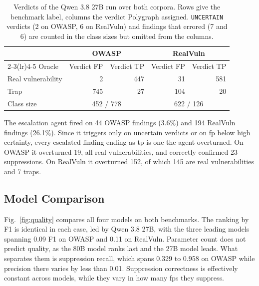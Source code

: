 \begin{table}[t]
\caption{Verdicts of the Qwen 3.8 27B run over both corpora. Rows give the
benchmark label, columns the verdict Polygraph assigned. \texttt{UNCERTAIN}
verdicts (2 on OWASP, 6 on RealVuln) and findings that errored (7 and 6) are
counted in the class sizes but omitted from the columns.}
\label{tab:confusion}
\centering
\footnotesize
\begin{tabular}{lrrrr}
\toprule
& \multicolumn{2}{c}{OWASP} & \multicolumn{2}{c}{RealVuln} \\
\cmidrule(lr){2-3}\cmidrule(lr){4-5}
Oracle & Verdict FP & Verdict TP & Verdict FP & Verdict TP \\
\midrule
Real vulnerability & 2   & 447 & 31 & 581 \\
Trap               & 745 & 27  & 104 & 20  \\
\midrule
Class size & \multicolumn{2}{c}{452 / 778} & \multicolumn{2}{c}{622 / 126} \\
\bottomrule
\end{tabular}
\end{table}

The escalation agent fired on 44 OWASP findings (3.6\%) and 194 RealVuln
findings (26.1\%). Since it triggers only on uncertain verdicts or on
\ac{fp} below high certainty, every escalated finding ending
as \ac{tp} is one the agent overturned. On OWASP it overturned
19, all real vulnerabilities, and correctly confirmed 23 suppressions. On
RealVuln it overturned 152, of which 145 are real vulnerabilities and 7 traps.

\subsection{Model Comparison}
\label{sec:model-comparison}

Fig.~\ref{fig:quality} compares all four models on both benchmarks.
The ranking by F1 is identical in each case, led
by Qwen 3.8 27B, with the three leading models spanning 0.09 F1 on OWASP and
0.11 on RealVuln. Parameter count does not predict quality, as
the 80B model ranks last and the 27B model leads. What separates them is
suppression recall, which spans 0.329 to 0.958 on OWASP while precision there
varies by less than 0.01. Suppression correctness is effectively constant across models, while they vary in how many \acp{fp} they suppress.

